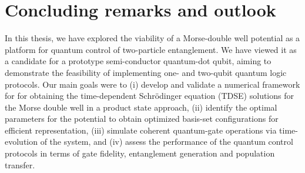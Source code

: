 \documentclass{subfiles}
\begin{document}
\chapter{Concluding remarks and outlook}
In this thesis, we have explored the viability of a Morse-double well potential as a platform for quantum control of two-particle entanglement. We have viewed it as a candidate for a prototype semi-conductor quantum-dot qubit, aiming to demonstrate the feasibility of implementing one- and two-qubit quantum logic protocols. Our main goals were to (i) develop and validate a numerical framework for for obtaining the time-dependent Schrödinger equation (TDSE) solutions for the Morse double well in a product state approach, (ii) identify the optimal parameters for the potential to obtain optimized basis-set configurations for efficient representation, (iii) simulate coherent quantum-gate operations via time-evolution of the system, and (iv) assess the performance of the quantum control protocols in terms of gate fidelity, entanglement generation and population transfer.
\end{document}
